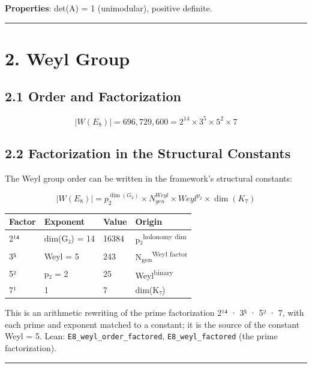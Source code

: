 \documentclass[11pt,a4paper]{article}
\begin{document}
\textbf{Properties}: det(A) = 1 (unimodular), positive definite.

\begin{center}\rule{\linewidth}{0.5pt}\end{center}

\section{2. Weyl Group}\label{weyl-group}

\subsection{2.1 Order and Factorization}\label{order-and-factorization}

\[|W(E_8)| = 696,729,600 = 2^{14} \times 3^5 \times 5^2 \times 7\]

\subsection{2.2 Factorization in the Structural Constants}\label{factorization-in-the-structural-constants}

The Weyl group order can be written in the framework's structural constants:

\[|W(E_8)| = p_2^{\dim(G_2)} \times N_{gen}^{Weyl} \times Weyl^{p_2} \times \dim(K_7)\]

\begin{longtable}[]{@{}llll@{}}
\toprule\noalign{}
Factor & Exponent & Value & Origin \\
\midrule\noalign{}
\endhead
\bottomrule\noalign{}
\endlastfoot
2¹⁴ & dim(G₂) = 14 & 16384 & p₂\textsuperscript{holonomy dim} \\
3⁵ & Weyl = 5 & 243 & N\textsubscript{gen}\textsuperscript{Weyl factor} \\
5² & p₂ = 2 & 25 & Weyl\textsuperscript{binary} \\
7¹ & 1 & 7 & dim(K₇) \\
\end{longtable}

This is an arithmetic rewriting of the prime factorization 2¹⁴ · 3⁵ · 5² · 7, with each prime and exponent matched to a constant; it is the source of the constant Weyl = 5. Lean: \texttt{E8\_\allowbreak{}weyl\_\allowbreak{}order\_\allowbreak{}factored}, \texttt{E8\_\allowbreak{}weyl\_\allowbreak{}factored} (the prime factorization).

\begin{center}\rule{\linewidth}{0.5pt}\end{center}
\end{document}
